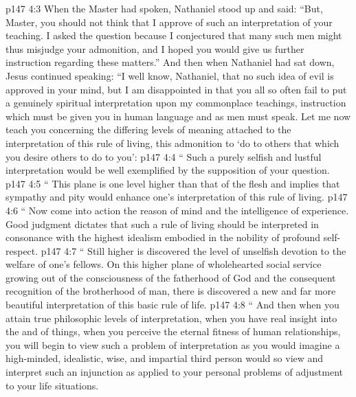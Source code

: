 \vs p147 4:3 When the Master had spoken, Nathaniel stood up and said: “But, Master, you should not think that I approve of such an interpretation of your teaching. I asked the question because I conjectured that many such men might thus misjudge your admonition, and I hoped you would give us further instruction regarding these matters.” And then when Nathaniel had sat down, Jesus continued speaking: \textcolor{ubdarkred}{“I well know, Nathaniel, that no such idea of evil is approved in your mind, but I am disappointed in that you all so often fail to put a genuinely spiritual interpretation upon my commonplace teachings, instruction which must be given you in human language and as men must speak. Let me now teach you concerning the differing levels of meaning attached to the interpretation of this rule of living, this admonition to ‘do to others that which you desire others to do to you’:}
\vs p147 4:4 \textcolor{ubdarkred}{“\bibnobreakspace {} Such a purely selfish and lustful interpretation would be well exemplified by the supposition of your question.}
\vs p147 4:5 \pc \textcolor{ubdarkred}{“\bibnobreakspace {} This plane is one level higher than that of the flesh and implies that sympathy and pity would enhance one’s interpretation of this rule of living.}
\vs p147 4:6 \pc \textcolor{ubdarkred}{“\bibnobreakspace {} Now come into action the reason of mind and the intelligence of experience. Good judgment dictates that such a rule of living should be interpreted in consonance with the highest idealism embodied in the nobility of profound self\hyp{}respect.}
\vs p147 4:7 \pc \textcolor{ubdarkred}{“\bibnobreakspace {} Still higher is discovered the level of unselfish devotion to the welfare of one’s fellows. On this higher plane of wholehearted social service growing out of the consciousness of the fatherhood of God and the consequent recognition of the brotherhood of man, there is discovered a new and far more beautiful interpretation of this basic rule of life.}
\vs p147 4:8 \pc \textcolor{ubdarkred}{“\bibnobreakspace {} And then when you attain true philosophic levels of interpretation, when you have real insight into the  and  of things, when you perceive the eternal fitness of human relationships, you will begin to view such a problem of interpretation as you would imagine a high\hyp{}minded, idealistic, wise, and impartial third person would so view and interpret such an injunction as applied to your personal problems of adjustment to your life situations.}
